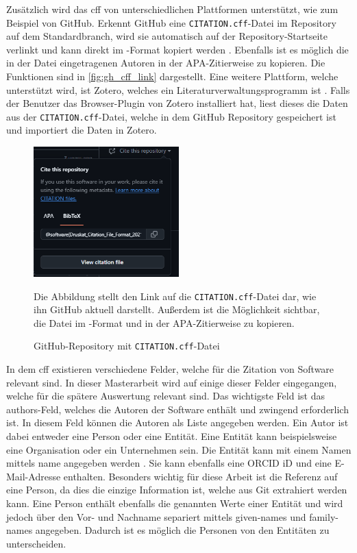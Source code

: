 Zusätzlich wird das \gls{cff} von unterschiedlichen Plattformen unterstützt, wie zum Beispiel von GitHub.
Erkennt GitHub eine \texttt{CITATION.cff}-Datei im Repository auf dem Standardbranch, wird sie automatisch auf der Repository-Startseite verlinkt und kann direkt im -Format kopiert werden \autocites{druskat_citation_2021}{github_about_2024-2}.
Ebenfalls ist es möglich die in der Datei eingetragenen Autoren in der APA-Zitierweise zu kopieren.
Die Funktionen sind in \autoref{fig:gh_cff_link} dargestellt.
Eine weitere Plattform, welche unterstützt wird, ist Zotero, welches ein Literaturverwaltungsprogramm ist \autocites{druskat_citation_2021}{zotero_zotero_2024}.
Falls der Benutzer das Browser-Plugin von Zotero installiert hat, liest dieses die Daten aus der \texttt{CITATION.cff}-Datei, welche in dem GitHub Repository gespeichert ist und importiert die Daten in Zotero.

\begin{figure}
    \centering
    \includegraphics[width=0.5\textwidth]{bilder/GH_CFF_link.png}
    \caption{GitHub-Repository mit \texttt{CITATION.cff}-Datei}
    \label{fig:gh_cff_link}
    \small
    \raggedright
    Die Abbildung stellt den Link auf die \texttt{CITATION.cff}-Datei dar, wie ihn GitHub aktuell darstellt.
    Außerdem ist die Möglichkeit sichtbar, die Datei im -Format und in der APA-Zitierweise zu kopieren.
\end{figure}

In dem \gls{cff} existieren verschiedene Felder, welche für die Zitation von Software relevant sind.
In dieser Masterarbeit wird auf einige dieser Felder eingegangen, welche für die spätere Auswertung relevant sind.
Das wichtigste Feld ist das \glqq authors\grqq{}-Feld, welches die Autoren der Software enthält und zwingend erforderlich ist.
In diesem Feld können die Autoren als Liste angegeben werden.
Ein Autor ist dabei entweder eine Person oder eine Entität.
Eine Entität kann beispielsweise eine Organisation oder ein Unternehmen sein.
Die Entität kann mit einem Namen mittels \glqq name\grqq{} angegeben werden \autocite{druskat_citation_2021}.
Sie kann ebenfalls eine ORCID iD und eine E-Mail-Adresse enthalten.
Besonders wichtig für diese Arbeit ist die Referenz auf eine Person, da dies die einzige Information ist, welche aus Git extrahiert werden kann.
Eine Person enthält ebenfalls die genannten Werte einer Entität und wird jedoch über den Vor- und Nachname separiert mittels \glqq given-names\grqq{} und \glqq family-names\grqq{} angegeben.
Dadurch ist es möglich die Personen von den Entitäten zu unterscheiden.

